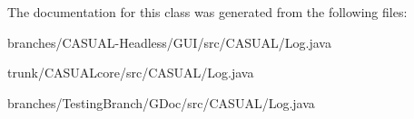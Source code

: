 The documentation for this class was generated from the following files\-:\begin{DoxyCompactItemize}
\item 
branches/\-C\-A\-S\-U\-A\-L-\/\-Headless/\-G\-U\-I/src/\-C\-A\-S\-U\-A\-L/Log.\-java\item 
trunk/\-C\-A\-S\-U\-A\-Lcore/src/\-C\-A\-S\-U\-A\-L/Log.\-java\item 
branches/\-Testing\-Branch/\-G\-Doc/src/\-C\-A\-S\-U\-A\-L/Log.\-java\end{DoxyCompactItemize}
